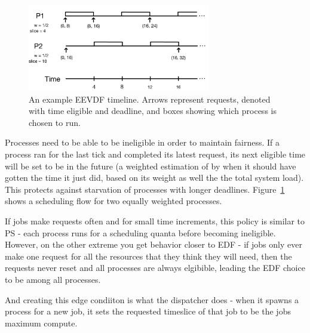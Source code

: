 \begin{figure}[t!]
    \centering
    \includegraphics[height=1.5in]{img/eevdf.png}
    \caption{An example EEVDF timeline. Arrows represent requests, denoted with time eligible and deadline, 
        and boxes showing which process is chosen to run. }
    \label{fig:eevdf}
\end{figure}

Processes need to be able to be ineligible in order to maintain fairness. If a
process ran for the last tick and completed its latest request, its next
eligible time will be set to be in the future (a weighted estimation of by when
it should have gotten the time it just did, based on its weight as well the the
total system load). This protects against starvation of processes with longer
deadlines. Figure~\ref{fig:eevdf} shows a scheduling flow for two equally weighted
processes.

If jobs make requests often and for small time increments, this policy is
similar to PS - each process runs for a scheduling quanta before becoming
ineligible. However, on the other extreme you get behavior closer to EDF - if
jobs only ever make one request for all the resources that they think they will
need, then the requests never reset and all processes are always elgibible,
leading the EDF choice to be among all processes.

And creating this edge condiiton is what the dispatcher does - when it spawns a
process for a new job, it sets the requested timeslice of that job to be the
jobs maximum compute. 

